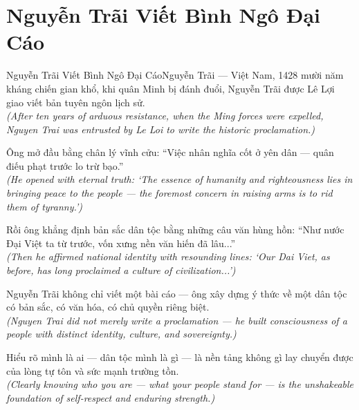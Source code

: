 \section{Nguyễn Trãi Viết Bình Ngô Đại Cáo}
\begin{truyen}{Nguyễn Trãi Viết Bình Ngô Đại Cáo}{Nguyễn Trãi --- Việt Nam, 1428}
 mười năm kháng chiến gian khổ, khi quân Minh bị đánh đuổi, Nguyễn Trãi được Lê Lợi giao viết bản tuyên ngôn lịch sử.\\[4pt]
\textit{(After ten years of arduous resistance, when the Ming forces were expelled, Nguyen Trai was entrusted by Le Loi to write the historic proclamation.)}

Ông mở đầu bằng chân lý vĩnh cửu: ``Việc nhân nghĩa cốt ở yên dân --- quân điếu phạt trước lo trừ bạo.''\\[4pt]
\textit{(He opened with eternal truth: `The essence of humanity and righteousness lies in bringing peace to the people --- the foremost concern in raising arms is to rid them of tyranny.')}

Rồi ông khẳng định bản sắc dân tộc bằng những câu văn hùng hồn: ``Như nước Đại Việt ta từ trước, vốn xưng nền văn hiến đã lâu...''\\[4pt]
\textit{(Then he affirmed national identity with resounding lines: `Our Dai Viet, as before, has long proclaimed a culture of civilization...')}

Nguyễn Trãi không chỉ viết một bài cáo --- ông xây dựng ý thức về một dân tộc có bản sắc, có văn hóa, có chủ quyền riêng biệt.\\[4pt]
\textit{(Nguyen Trai did not merely write a proclamation --- he built consciousness of a people with distinct identity, culture, and sovereignty.)}

\end{truyen}
\begin{baihoc}
  Hiểu rõ mình là ai --- dân tộc mình là gì --- là nền tảng không gì lay chuyển được của lòng tự tôn và sức mạnh trường tồn.\\[4pt]
  \textit{(Clearly knowing who you are --- what your people stand for --- is the unshakeable foundation of self-respect and enduring strength.)}
\end{baihoc}

